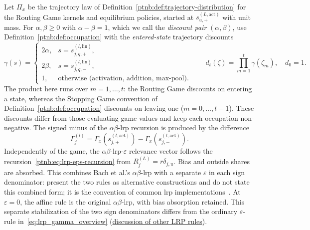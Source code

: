 Let $\Pi_x$ be the trajectory law of Definition~\ref{ptnb:def:trajectory-distribution} for the Routing Game kernels and equilibrium policies, started at $s_{u,+}^{(L,\mathrm{act})}$ with unit mass. For $\alpha,\beta\geq0$ with $\alpha-\beta=1$, which we call the \emph{discount pair} $(\alpha,\beta)$, use Definition~\ref{ptnb:def:occupation} with the \emph{entered-state} trajectory discounts
\begin{equation}\label{ptnb:eq:routing-edge-discount}
 \gamma(s)=\begin{cases}
 2\alpha,&s=s_{j,q,+}^{(l,\mathrm{lin})},\\
 2\beta,&s=s_{j,q,-}^{(l,\mathrm{lin})},\\
 1,&\text{otherwise (activation, addition, max-pool).}
 \end{cases}
 \qquad
 d_t(\zeta)=\prod_{m=1}^t\gamma(\zeta_m),\quad d_0=1.
\end{equation}
The product here runs over $m=1,\ldots,t$: the Routing Game discounts on entering a state, whereas the Stopping Game convention of Definition~\ref{ptnb:def:occupation} discounts on leaving one ($m=0,\ldots,t-1$).
These discounts differ from those evaluating game values and keep each occupation non-negative. The signed minus of the $\alpha\beta$-\ac{lrp} recursion is produced by the difference
\begin{equation}\label{ptnb:eq:routing-Gamma-pair}
 \Gamma_j^{(l)}=\Gamma_x(s_{j,+}^{(l,\mathrm{act})})-\Gamma_x(s_{j,-}^{(l,\mathrm{act})}).
\end{equation}
Independently of the game, the $\alpha\beta$-\ac{lrp}-$\varepsilon$ relevance vector follows the recursion~\eqref{ptnb:eq:lrp-eps-recursion} from $R_j^{(L)}=r\delta_{j,u}$. Bias and outside shares are absorbed. This combines Bach et al.'s $\alpha\beta$-\ac{lrp} with a separate $\varepsilon$ in each sign denominator: \textcite{Bach2015} present the two rules as alternative constructions and do not state this combined form; it is the convention of common \ac{lrp} implementations~\parencite{Anders2021Zennit}. At $\varepsilon=0$, the affine rule is the original $\alpha\beta$-\ac{lrp}, with bias absorption retained. This separate stabilization of the two sign denominators differs from the ordinary $\varepsilon$-rule in~\eqref{eq:lrp_gamma_overview} (\hyperref[par:other_lrp_games]{discussion of other LRP rules}).

